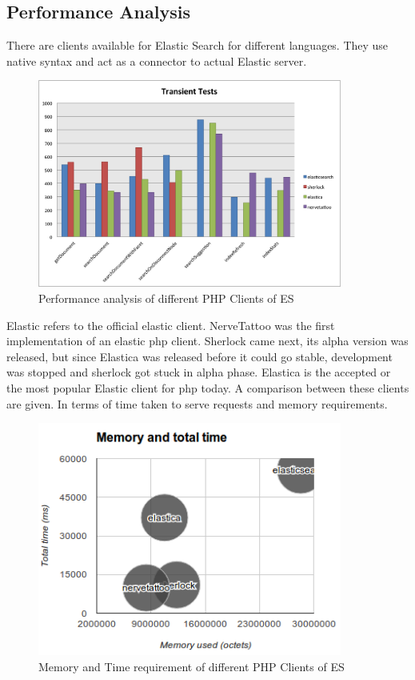 \documentclass[12pt]{article}
\begin{document}
		\subsection{Performance Analysis}
			There are clients available for Elastic Search for different languages. They use native syntax and act as a connector to actual Elastic server.


			\begin{figure}[ht]
				\centering\includegraphics[width=10cm]{images/clients}
				\caption{Performance analysis of different PHP Clients of ES}
			\end{figure}

			Elastic refers to the official elastic client. NerveTattoo was the first implementation of an elastic \ac{php} client. Sherlock came next, its alpha version was released, but since Elastica was released before it could go stable, development was stopped and sherlock got stuck in alpha phase. Elastica is the accepted or the most popular Elastic client for \ac{php} today\cite{memorybenchmark}. A comparison between these clients are given. In terms of time taken to serve requests\cite{benchmark} and memory requirements.

			\begin{figure}[ht]
				\centering\includegraphics[width=10cm]{images/clients_memory}
				\caption{Memory and Time requirement of different PHP Clients of ES}
			\end{figure}

	\newpage
	
	
\end{document}
